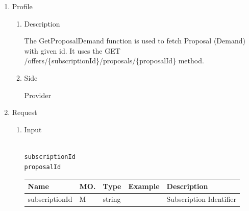 \newpage


\begin{enumerate}

\item Profile

\begin{enumerate}

\item Description

The GetProposalDemand function is used to fetch Proposal (Demand) with given id. 
It uses the GET /offers/\{subscriptionId\}/proposals/\{proposalId\} method.

\item Side

Provider

\end{enumerate}

\item Request

\begin{enumerate}

\item Input

\begin{tcolorbox}[boxrule=0pt, frame empty]
\begin{verbatim}

subscriptionId
proposalId

\end{verbatim}
\end{tcolorbox}


\begin{table}[H]
\footnotesize

\begin{center}
\begin{tabular}{|p{3cm}|l|p{3cm}|p{3cm}|p{4cm}|} 
\hline
\rowcolor{lightgray}	Name	& MO.	& Type	& Example & 	Description \\
\hline

subscriptionId	& M	& 	string			&		&	Subscription Identifier \\ 

\hline


\end{tabular}
\end{center}
\end{table}
\end{enumerate}
\end{enumerate}
